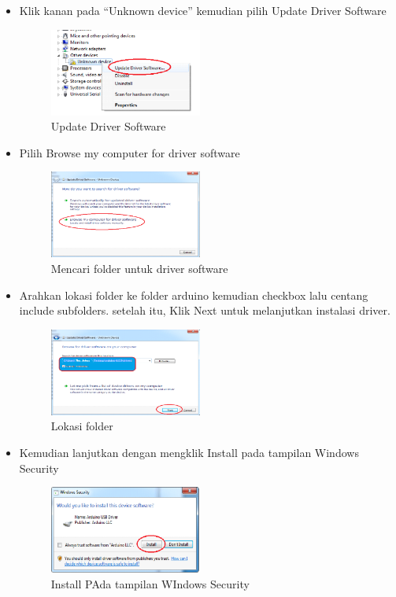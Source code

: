 \begin{enumerate}
\begin{itemize}
\item Klik kanan pada “Unknown device” kemudian pilih Update Driver Software
\begin{figure}[ht!]
\includegraphics[width=5cm]{figures/5/1174054/5.png}
\centering
\caption{Update Driver Software}
\end{figure}

\item Pilih Browse my computer for driver software
\begin{figure}[ht!]
\includegraphics[width=5cm]{figures/5/1174054/6.png}
\centering
\caption{Mencari folder untuk driver software}
\end{figure}

\item  Arahkan lokasi folder ke folder arduino kemudian checkbox lalu centang include subfolders. setelah itu, Klik Next untuk melanjutkan instalasi driver.
\begin{figure}[ht!]
\includegraphics[width=5cm]{figures/5/1174054/7.png}
\centering
\caption{Lokasi folder}
\end{figure}

\item Kemudian lanjutkan dengan mengklik Install pada tampilan Windows Security
\begin{figure}[ht!]
\includegraphics[width=5cm]{figures/5/1174054/8.png}
\centering
\caption{Install PAda tampilan WIndows Security}
\end{figure}


\end{itemize}
\end{enumerate}
